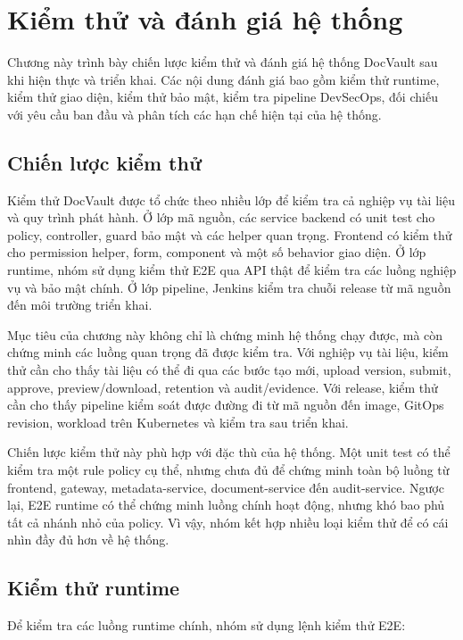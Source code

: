 \chapter{Kiểm thử và đánh giá hệ thống}

Chương này trình bày chiến lược kiểm thử và đánh giá hệ thống DocVault sau khi hiện thực và triển khai. Các nội dung đánh giá bao gồm kiểm thử runtime, kiểm thử giao diện, kiểm thử bảo mật, kiểm tra pipeline DevSecOps, đối chiếu với yêu cầu ban đầu và phân tích các hạn chế hiện tại của hệ thống.

\section{Chiến lược kiểm thử}

Kiểm thử DocVault được tổ chức theo nhiều lớp để kiểm tra cả nghiệp vụ tài liệu và quy trình phát hành. Ở lớp mã nguồn, các service backend có unit test cho policy, controller, guard bảo mật và các helper quan trọng. Frontend có kiểm thử cho permission helper, form, component và một số behavior giao diện. Ở lớp runtime, nhóm sử dụng kiểm thử E2E qua API thật để kiểm tra các luồng nghiệp vụ và bảo mật chính. Ở lớp pipeline, Jenkins kiểm tra chuỗi release từ mã nguồn đến môi trường triển khai.

Mục tiêu của chương này không chỉ là chứng minh hệ thống chạy được, mà còn chứng minh các luồng quan trọng đã được kiểm tra. Với nghiệp vụ tài liệu, kiểm thử cần cho thấy tài liệu có thể đi qua các bước tạo mới, upload version, submit, approve, preview/download, retention và audit/evidence. Với release, kiểm thử cần cho thấy pipeline kiểm soát được đường đi từ mã nguồn đến image, GitOps revision, workload trên Kubernetes và kiểm tra sau triển khai.

Chiến lược kiểm thử này phù hợp với đặc thù của hệ thống. Một unit test có thể kiểm tra một rule policy cụ thể, nhưng chưa đủ để chứng minh toàn bộ luồng từ frontend, gateway, metadata-service, document-service đến audit-service. Ngược lại, E2E runtime có thể chứng minh luồng chính hoạt động, nhưng khó bao phủ tất cả nhánh nhỏ của policy. Vì vậy, nhóm kết hợp nhiều loại kiểm thử để có cái nhìn đầy đủ hơn về hệ thống.

\section{Kiểm thử runtime}

Để kiểm tra các luồng runtime chính, nhóm sử dụng lệnh kiểm thử E2E:

